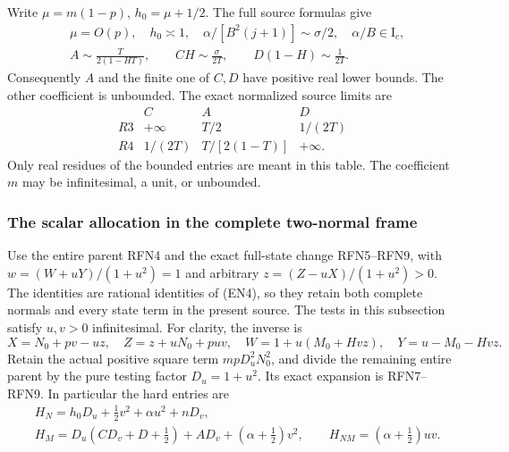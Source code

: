Write $\mu=m(1-p)$, $h_0=\mu+1/2$. The full source formulas give
\[
\begin{aligned}
&\mu=O(p),\quad h_0\asymp1,\quad
\alpha/[B^2(j+1)]\sim\sigma/2,\quad \alpha/B\in\mathrm I_c,\\
&A\sim\frac{T}{2(1-HT)},\qquad
CH\sim\frac{\sigma}{2T},\qquad
D(1-H)\sim\frac1{2T}.
\end{aligned}                                                    \tag{EN8}
\]
Consequently $A$ and the finite one of $C,D$ have positive real
lower bounds. The other coefficient is unbounded. The exact
normalized source limits are
\[
\begin{array}{c|c|c|c}
 & C&A&D\\ \hline
R3&+\infty&T/2&1/(2T)\\
R4&1/(2T)&T/[2(1-T)]&+\infty .
\end{array}                                                    \tag{EN9}
\]
Only real residues of the bounded entries are meant in this table.
The coefficient $m$ may be infinitesimal, a unit, or unbounded.

\subsubsection*{The scalar allocation in the complete two-normal frame}

Use the entire parent RFN4 and the exact full-state change RFN5--RFN9,
with $w=(W+uY)/(1+u^2)=1$ and arbitrary $z=(Z-uX)/(1+u^2)>0$.
The identities are rational identities of (EN4), so they retain
both complete normals and every state term in the present source.
The tests in this subsection satisfy $u,v>0$ infinitesimal.
For clarity, the inverse is
\[
X=N_0+pv-uz,\quad Z=z+uN_0+puv,\quad
W=1+u(M_0+Hvz),\quad Y=u-M_0-Hvz.                       \tag{EN10}
\]
Retain the actual positive square term $mpD_u^2N_0^2$, and divide the
remaining entire parent by the pure testing factor $D_u=1+u^2$.
Its exact expansion is RFN7--RFN9. In particular the hard entries are
\[
\begin{aligned}
&H_N=h_0D_u+\tfrac12v^2+\alpha u^2+nD_v,\\
&H_M=D_u(CD_v+D+\tfrac12)+AD_v+(\alpha+\tfrac12)v^2,\qquad
H_{NM}=(\alpha+\tfrac12)uv .
\end{aligned}                                                    \tag{EN11}
\]

